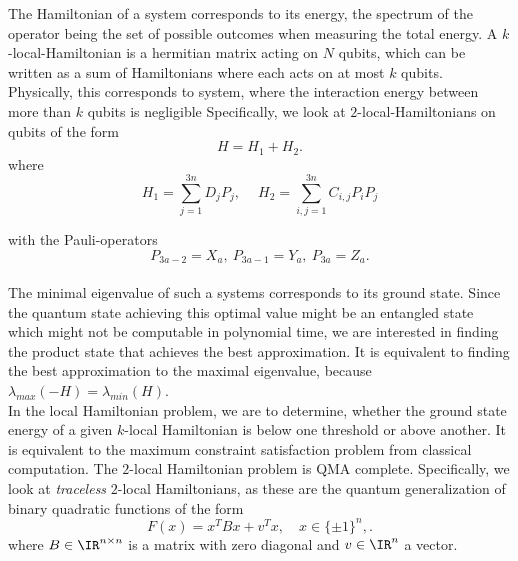 The Hamiltonian of a system corresponds to its energy, the spectrum of the operator being the set of possible outcomes when measuring the total energy.
A $k$-local-Hamiltonian is a hermitian matrix acting on $N$ qubits, which can be written as a sum of Hamiltonians where each acts on at most $k$ qubits.
Physically, this corresponds to system, where the interaction energy between more than $k$ qubits is negligible
Specifically, we look at $2$-local-Hamiltonians on qubits of the form \[
H = H_1+H_2
.\]
where
\begin{equation}\label{ham}
	H_1 = \sum_{j=1}^{3n} D_jP_j,\quad ~ H_2  = \sum_{i,j=1}^{3n} C_{i,j}P_iP_j
\end{equation}

with the Pauli-operators \[
	P_{3a-2}=X_a, ~ P_{3a-1}=Y_a, ~ P_{3a}=Z_a
.\]\\
The minimal eigenvalue of such a systems corresponds to its ground state.
Since the quantum state achieving this optimal value might be an entangled state which might not be computable in polynomial time, we are interested in finding the product state that achieves the best approximation.
It is equivalent to finding the best approximation to the maximal eigenvalue, because $\lambda_{max}(-H)=\lambda_{min}(H)$. \cite{gharibian19}\\
In the local Hamiltonian problem, we are to determine, whether the ground state energy of a given $k$-local Hamiltonian is below one threshold or above another.
It is equivalent to the maximum constraint satisfaction problem from classical computation.
The $2$-local Hamiltonian problem is QMA complete.\cite{kempe06}
Specifically, we look at \emph{traceless} $2$-local Hamiltonians, as these are the quantum generalization of binary quadratic functions of the form \[
	F(x) = x^{T}Bx +v^{T}x, \quad x\in \{\pm 1\} ^{n},
.\]
where $B\in\IR^{n\times n}$ is a matrix with zero diagonal and $v\in\IR^{n}$ a vector.
